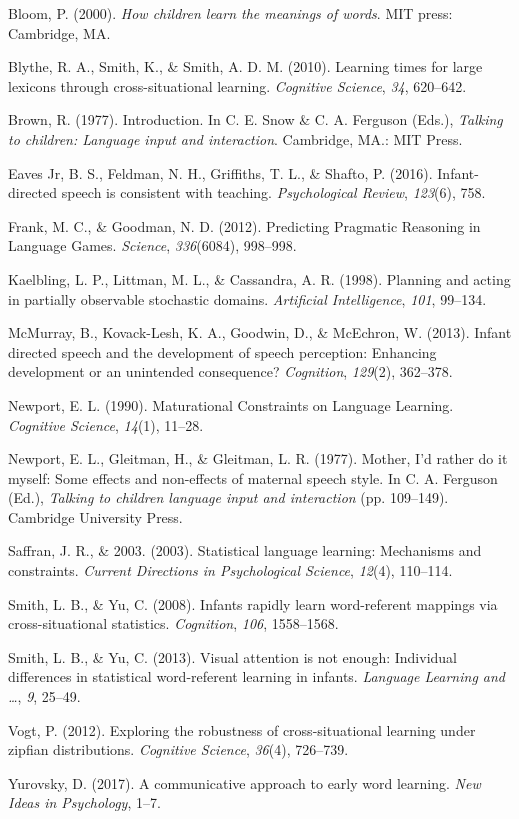 \documentclass[10pt, letterpaper]{article}
\begin{document}
\hypertarget{refs}{}
\hypertarget{ref-bloom2000}{}
Bloom, P. (2000). \emph{How children learn the meanings of words}. MIT
press: Cambridge, MA.

\hypertarget{ref-blythe2010}{}
Blythe, R. A., Smith, K., \& Smith, A. D. M. (2010). Learning times for
large lexicons through cross-situational learning. \emph{Cognitive
Science}, \emph{34}, 620--642.

\hypertarget{ref-brown1977}{}
Brown, R. (1977). Introduction. In C. E. Snow \& C. A. Ferguson (Eds.),
\emph{Talking to children: Language input and interaction}. Cambridge,
MA.: MIT Press.

\hypertarget{ref-eaves-jr2016}{}
Eaves Jr, B. S., Feldman, N. H., Griffiths, T. L., \& Shafto, P. (2016).
Infant-directed speech is consistent with teaching. \emph{Psychological
Review}, \emph{123}(6), 758.

\hypertarget{ref-frank2012}{}
Frank, M. C., \& Goodman, N. D. (2012). Predicting Pragmatic Reasoning
in Language Games. \emph{Science}, \emph{336}(6084), 998--998.

\hypertarget{ref-kaelbling1998}{}
Kaelbling, L. P., Littman, M. L., \& Cassandra, A. R. (1998). Planning
and acting in partially observable stochastic domains. \emph{Artificial
Intelligence}, \emph{101}, 99--134.

\hypertarget{ref-mcmurray2013}{}
McMurray, B., Kovack-Lesh, K. A., Goodwin, D., \& McEchron, W. (2013).
Infant directed speech and the development of speech perception:
Enhancing development or an unintended consequence? \emph{Cognition},
\emph{129}(2), 362--378.

\hypertarget{ref-newport1990}{}
Newport, E. L. (1990). Maturational Constraints on Language Learning.
\emph{Cognitive Science}, \emph{14}(1), 11--28.

\hypertarget{ref-newport1977}{}
Newport, E. L., Gleitman, H., \& Gleitman, L. R. (1977). Mother, I'd
rather do it myself: Some effects and non-effects of maternal speech
style. In C. A. Ferguson (Ed.), \emph{Talking to children language input
and interaction} (pp. 109--149). Cambridge University Press.

\hypertarget{ref-saffran2003}{}
Saffran, J. R., \& 2003. (2003). Statistical language learning:
Mechanisms and constraints. \emph{Current Directions in Psychological
Science}, \emph{12}(4), 110--114.

\hypertarget{ref-smith2008}{}
Smith, L. B., \& Yu, C. (2008). Infants rapidly learn word-referent
mappings via cross-situational statistics. \emph{Cognition}, \emph{106},
1558--1568.

\hypertarget{ref-smith2013}{}
Smith, L. B., \& Yu, C. (2013). Visual attention is not enough:
Individual differences in statistical word-referent learning in infants.
\emph{Language Learning and \ldots{}}, \emph{9}, 25--49.

\hypertarget{ref-vogt2012}{}
Vogt, P. (2012). Exploring the robustness of cross-situational learning
under zipfian distributions. \emph{Cognitive Science}, \emph{36}(4),
726--739.

\hypertarget{ref-yurovsky2017}{}
Yurovsky, D. (2017). A communicative approach to early word learning.
\emph{New Ideas in Psychology}, 1--7.


\end{document}
